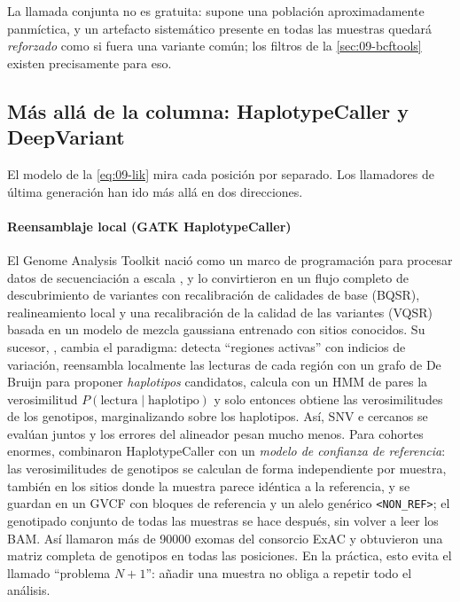 La llamada conjunta no es gratuita: supone una población aproximadamente panmíctica, y un artefacto sistemático presente en todas las muestras quedará \emph{reforzado} como si fuera una variante común; los filtros de la \cref{sec:09-bcftools} existen precisamente para eso.

\subsection{Más allá de la columna: HaplotypeCaller y DeepVariant}

El modelo de la \cref{eq:09-lik} mira cada posición por separado. Los llamadores de última generación han ido más allá en dos direcciones.

\paragraph{Reensamblaje local (GATK HaplotypeCaller)} El Genome Analysis Toolkit nació como un marco de programación para procesar datos de secuenciación a escala \parencite{c09-mckenna2010}, y \textcite{c09-depristo2011} lo convirtieron en un flujo completo de descubrimiento de variantes con recalibración de calidades de base (BQSR), realineamiento local y una recalibración de la calidad de las variantes (VQSR) basada en un modelo de mezcla gaussiana entrenado con sitios conocidos. Su sucesor, , cambia el paradigma: detecta ``regiones activas'' con indicios de variación, reensambla localmente las lecturas de cada región con un grafo de De Bruijn para proponer \emph{haplotipos} candidatos, calcula con un HMM de pares la verosimilitud $P(\text{lectura}\mid\text{haplotipo})$ y solo entonces obtiene las verosimilitudes de los genotipos, marginalizando sobre los haplotipos. Así, SNV e  cercanos se evalúan juntos y los errores del alineador pesan mucho menos. Para cohortes enormes, \textcite{c09-poplin2017} combinaron HaplotypeCaller con un \emph{modelo de confianza de referencia}: las verosimilitudes de genotipos se calculan de forma independiente por muestra, también en los sitios donde la muestra parece idéntica a la referencia, y se guardan en un GVCF con bloques de referencia y un alelo genérico \texttt{<NON\_REF>}; el genotipado conjunto de todas las muestras se hace después, sin volver a leer los BAM. Así llamaron más de \num{90000} exomas del consorcio ExAC y obtuvieron una matriz completa de genotipos en todas las posiciones. En la práctica, esto evita el llamado ``problema $N+1$'': añadir una muestra no obliga a repetir todo el análisis.

